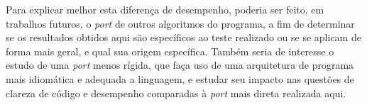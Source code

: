 \documentclass[tg]{mdtufsm}
\begin{document}
Para explicar melhor esta diferença de desempenho, poderia ser feito, em trabalhos futuros, o \emph{port} de outros algoritmos do programa, a fim de determinar se os resultados obtidos aqui são específicos ao teste realizado ou se se aplicam de forma mais geral, e qual sua origem específica. Também seria de interesse o estudo de uma \emph{port} menos rígida, que faça uso de uma arquitetura de programa mais idiomática e adequada a linguagem, e estudar seu impacto nas questões de clareza de código e desempenho comparadas à \emph{port} mais direta realizada aqui.

\setlength{\baselineskip}{\baselineskip}


\end{document}
